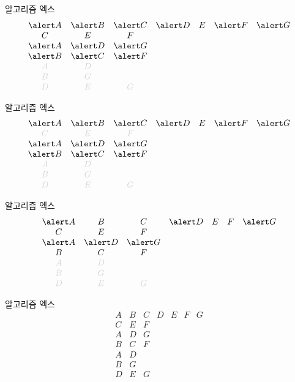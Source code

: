 \documentclass[xcolor=svgnames]{beamer}
\let\a\alert
\def\g{\color{LightGray}}
\begin{document}
%
\begin{frame}{알고리즘 엑스}
\Large\boldmath
  $$
  \begin{array}{ccccccc}
    \a A & \a B & \a C & \a D & E & \a F & \a G\\
    C & E & F &&&&\\
    \a A & \a D & \a G &&&&\\
    \a B & \a C & \a F &&&&\\
    \g A & \g D &&&&&\\
    \g B & \g G &&&&&\\
    \g D & \g E & \g G &&&&
  \end{array}
  $$
\end{frame}

%
\begin{frame}{알고리즘 엑스}
\Large\boldmath
  $$
  \begin{array}{ccccccc}
    \a A & \a B & \a C & \a D & E & \a F & \a G\\
    \g C & \g E & \g F &&&&\\
    \a A & \a D & \a G &&&&\\
    \a B & \a C & \a F &&&&\\
    \g A & \g D &&&&&\\
    \g B & \g G &&&&&\\
    \g D & \g E & \g G &&&&
  \end{array}
  $$
\end{frame}

%
\begin{frame}{알고리즘 엑스}
\Large\boldmath
  $$
  \begin{array}{ccccccc}
    \a A & B & C & \a D & E & F & \a G\\
    C & E & F &&&&\\
    \a A & \a D & \a G &&&&\\
    B & C & F &&&&\\
    \g A & \g D &&&&&\\
    \g B & \g G &&&&&\\
    \g D & \g E & \g G &&&&
  \end{array}
  $$
\end{frame}

%
\begin{frame}{알고리즘 엑스}
\Large\boldmath
  $$
  \begin{array}{ccccccc}
    A & B & C & D & E & F & G\\
    C & E & F &&&&\\
    A & D & G &&&&\\
    B & C & F &&&&\\
    A & D &&&&&\\
    B & G &&&&&\\
    D & E & G &&&&
  \end{array}
  $$
\end{frame}
\end{document}
